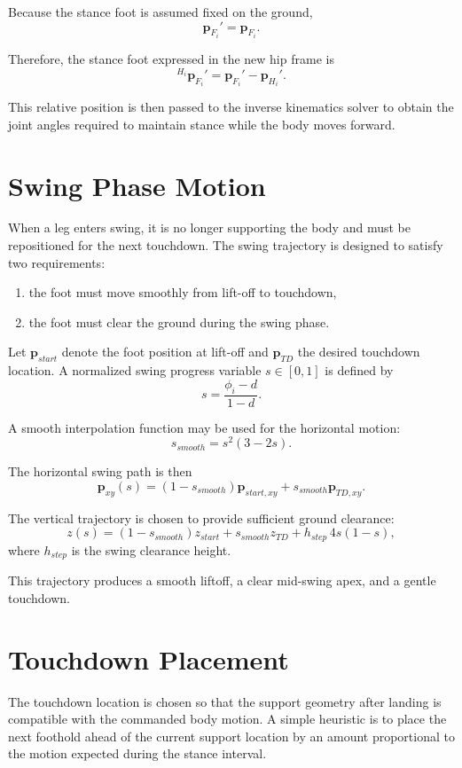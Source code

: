 \documentclass[11pt,a4paper]{report}
\begin{document}
Because the stance foot is assumed fixed on the ground,
\[
\mathbf{p}_{F_i}' = \mathbf{p}_{F_i}.
\]

Therefore, the stance foot expressed in the new hip frame is
\[
{}^{H_i}\mathbf{p}_{F_i}' = \mathbf{p}_{F_i}' - \mathbf{p}_{H_i}'.
\]

This relative position is then passed to the inverse kinematics solver to obtain the joint angles required to maintain stance while the body moves forward.

\section{Swing Phase Motion}

When a leg enters swing, it is no longer supporting the body and must be repositioned for the next touchdown. The swing trajectory is designed to satisfy two requirements:
\begin{enumerate}
    \item the foot must move smoothly from lift-off to touchdown,
    \item the foot must clear the ground during the swing phase.
\end{enumerate}

Let \(\mathbf{p}_{start}\) denote the foot position at lift-off and \(\mathbf{p}_{TD}\) the desired touchdown location. A normalized swing progress variable \(s \in [0,1]\) is defined by
\[
s = \frac{\phi_i - d}{1-d}.
\]

A smooth interpolation function may be used for the horizontal motion:
\[
s_{smooth} = s^2(3-2s).
\]

The horizontal swing path is then
\[
\mathbf{p}_{xy}(s) = (1-s_{smooth})\mathbf{p}_{start,xy} + s_{smooth}\mathbf{p}_{TD,xy}.
\]

The vertical trajectory is chosen to provide sufficient ground clearance:
\[
z(s) = (1-s_{smooth})z_{start} + s_{smooth}z_{TD} + h_{step} \, 4s(1-s),
\]
where \(h_{step}\) is the swing clearance height.

This trajectory produces a smooth liftoff, a clear mid-swing apex, and a gentle touchdown.

\section{Touchdown Placement}

The touchdown location is chosen so that the support geometry after landing is compatible with the commanded body motion. A simple heuristic is to place the next foothold ahead of the current support location by an amount proportional to the motion expected during the stance interval.
\end{document}
